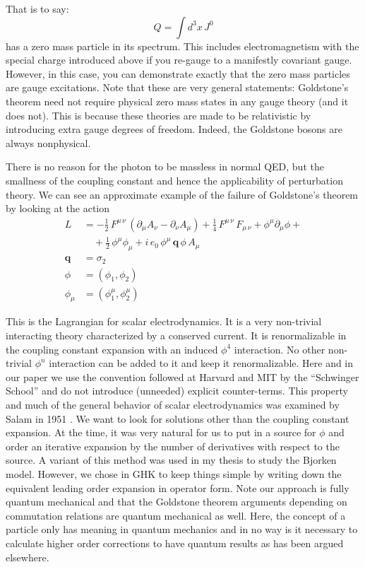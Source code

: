 \documentclass[preprintnumbers,12pt]{revtex4-2}
\newcommand{\pa}{\partial}
\begin{document}
That is to say:
\begin{equation*}
  Q = \int d^3x\, J^0
\end{equation*}
has a zero mass particle in its spectrum. This includes
electromagnetism with the special charge introduced above if you
re-gauge to a manifestly covariant gauge. However, in this case, you
can demonstrate exactly that the zero mass particles are gauge
excitations. Note that these are very general statements: Goldstone's
theorem need not require physical zero mass states in any gauge theory
(and it does not). This is because these theories are made to be
relativistic by introducing extra gauge degrees of freedom. Indeed,
the Goldstone bosons are always nonphysical.

There is no reason for the photon to be massless in normal QED, but
the smallness of the coupling constant and hence the applicability of
perturbation theory. We can see an approximate example of the
failure of Goldstone's theorem by looking at the action
\begin{align*}
  L &= -\frac{1}{2}\,
  F^{\mu\, \nu}\, (\pa_{\mu}A_{\nu} - \pa_{\nu}A_{\mu}) +
    \frac{1}{4}\, F^{\mu\, \nu}\,F_{\mu\, \nu} + \phi^{\mu}\pa_{\mu}\phi  + \\
  &\quad+ \frac{1}{2}\, \phi^{\mu}\phi_{\mu} + i\,e_0\,
    \phi^{\mu}\, \mathbf{q}\, \phi\, A_{\mu} \\
  \mathbf{q} &= \sigma_2 \\
  \phi &= (\phi_1, \phi_2) \\
    \phi_{\mu} &= (\phi^{\mu}_{1},\phi^{\mu}_{2})
\end{align*}

This is the Lagrangian for scalar electrodynamics. It is a very
non-trivial interacting theory characterized by a conserved
current. It is renormalizable in the coupling constant expansion with
an induced $\phi^{4}$ interaction. No other non-trivial $\phi^{n}$
interaction can be added to it and keep it renormalizable. Here and in our paper we use the
convention followed at Harvard and MIT by the ``Schwinger School'' and do not introduce (unneeded) explicit
counter-terms. This property and much of the general behavior of scalar electrodynamics was examined by Salam in 1951
\cite{as;1951}. We want to look for solutions other than the coupling constant expansion.
At the time, it was very natural for us to put in a source for $\phi$
and order an iterative expansion by the number of derivatives with
respect to the source. A variant of this method was used in my thesis to study the Bjorken model.
However, we chose in GHK to keep things simple by writing down the equivalent leading order expansion
in operator form. Note our approach is fully quantum mechanical and that the Goldstone theorem arguments
depending on commutation relations are quantum mechanical as well. Here, the concept of a particle only has
meaning in quantum mechanics and in no way is it necessary to calculate higher order corrections to have
quantum results as has been argued elsewhere.
\end{document}
